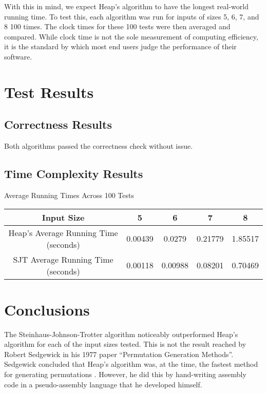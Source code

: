 \documentclass[10pt, oneside]{article}   	%
\begin{document}
With this in mind, we expect Heap's algorithm to have the longest real-world running time. To test this, each algorithm was run for inputs of sizes 5, 6, 7, and 8 100 times. The clock times for these 100 tests were then averaged and compared. While clock time is not the sole measurement of computing efficiency, it is the standard by which most end users judge the performance of their software.

\section{Test Results}

\subsection{Correctness Results}

Both algorithms passed the correctness check without issue.

\subsection{Time Complexity Results}

\begin{center}
Average Running Times Across 100 Tests \\
\begin{tabular}{|c|c|c|c|c|}
	\hline
	Input Size & 5 & 6 & 7 & 8 \\
	\hline
	Heap's Average Running Time (seconds) & 0.00439 & 0.0279 & 0.21779 & 1.85517 \\
	\hline
	SJT Average Running Time (seconds) & 0.00118 & 0.00988 & 0.08201 & 0.70469 \\
	\hline
\end{tabular}
\end{center}

\section{Conclusions}

The Steinhaus-Johnson-Trotter algorithm noticeably outperformed Heap's algorithm for each of the input sizes tested. This is not the result reached by Robert Sedgewick in his 1977 paper ``Permutation Generation Methods''. Sedgewick concluded that Heap's algorithm was, at the time, the fastest method for generating permutations \cite{sedgewick}. However, he did this by hand-writing assembly code in a pseudo-assembly language that he developed himself.
\end{document}
